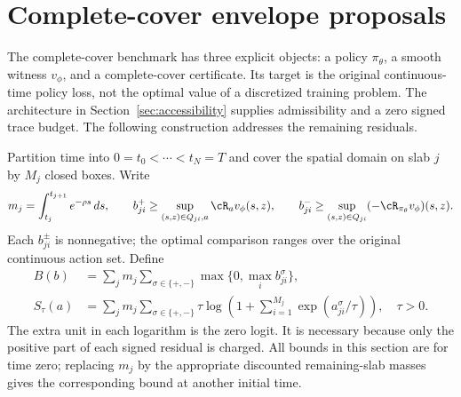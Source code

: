 \section{Complete-cover envelope proposals}\label{sec:aligned}
The complete-cover benchmark has three explicit objects: a policy $\pi_\theta$, a smooth witness $v_\phi$, and a complete-cover certificate. Its target is the original continuous-time policy loss, not the optimal value of a discretized training problem. The architecture in Section~\ref{sec:accessibility} supplies admissibility and a zero signed trace budget. The following construction addresses the remaining residuals.

Partition time into $0=t_0<\cdots<t_N=T$ and cover the spatial domain on slab $j$ by $M_j$ closed boxes. Write
\[
 m_j=\int_{t_j}^{t_{j+1}}e^{-\rho s}\,ds,
 \qquad b^+_{ji}\geq\sup_{(s,z)\in Q_{ji},a}\cR_a v_\phi(s,z),\qquad
 b^-_{ji}\geq\sup_{(s,z)\in Q_{ji}}(-\cR_{\pi_\theta}v_\phi)(s,z).
\]
Each $b^\pm_{ji}$ is nonnegative; the optimal comparison ranges over the original continuous action set. Define
\begin{align}
 B(b)&=\sum_j m_j\sum_{\sigma\in\{+,-\}}\max\{0,\max_i b^\sigma_{ji}\},\label{eq:coverB}\\
 S_\tau(a)&=\sum_jm_j\sum_{\sigma\in\{+,-\}}
 \tau\log\left(1+\sum_{i=1}^{M_j}\exp(a^\sigma_{ji}/\tau)\right),\quad \tau>0.\label{eq:smoothS}
\end{align}
The extra unit in each logarithm is the zero logit. It is necessary because only the positive part of each signed residual is charged. All bounds in this section are for time zero; replacing $m_j$ by the appropriate discounted remaining-slab masses gives the corresponding bound at another initial time.

